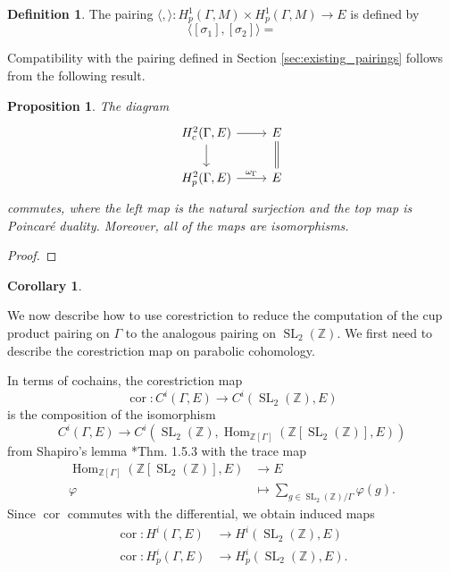 \documentclass[10pt]{amsart}
\theoremstyle{plain}
\newtheorem{proposition}[theorem]{Proposition}
\newtheorem{corollary}[theorem]{Corollary}
\theoremstyle{definition}
\newtheorem{definition}[theorem]{Definition}
\newcommand{\ZZ}{{\mathbb{Z}}}
\DeclareMathOperator{\Hom}{Hom}
\DeclareMathOperator{\SL}{SL}
\DeclareMathOperator{\cor}{cor}
\begin{document}
\begin{definition}
The pairing $\langle , \rangle : H^1_p(\Gamma, M) \times H^1_p(\Gamma, M) \to E$ is defined by
\[
\langle [\sigma_1], [\sigma_2] \rangle =
\]
\end{definition}
Compatibility with the pairing defined in Section \ref{sec:existing_pairings} follows from the following result.

\begin{proposition}
The diagram
\[
\begin{tikzcd}
H^2_c(\Gamma, E) \arrow{r} \arrow{d} & E \arrow[equal]{d} \\
H^2_p(\Gamma, E) \arrow{r}{\omega_\Gamma} & E
\end{tikzcd}
\]
commutes, where the left map is the natural surjection and the top map is Poincar\'e duality.  Moreover, all of the maps are isomorphisms.
\end{proposition}
\begin{proof}

\end{proof}

\begin{corollary}

\end{corollary}

We now describe how to use corestriction to reduce the computation of the cup product pairing
on $\Gamma$ to the analogous pairing on $\SL_2(\ZZ)$.  We first need to describe the corestriction
map on parabolic cohomology.

In terms of cochains, the corestriction map
\[
\cor : C^i(\Gamma, E) \to C^i(\SL_2(\ZZ), E)
\]
is the composition of the isomorphism
\[
C^i(\Gamma, E) \to C^i(\SL_2(\ZZ), \Hom_{\ZZ[\Gamma]}(\ZZ[\SL_2(\ZZ)], E))
\]
from Shapiro's lemma \cite{Sharifi}*{Thm. 1.5.3} with the trace map
\begin{align*}
\Hom_{\ZZ[\Gamma]}(\ZZ[\SL_2(\ZZ)], E) &\to E \\
\varphi &\mapsto \sum_{g \in \SL_2(\ZZ)/\Gamma} \varphi(g).
\end{align*}
Since $\cor$ commutes with the differential, we obtain induced maps
\begin{align*}
\cor : H^i(\Gamma, E) &\to H^i(\SL_2(\ZZ), E) \\
\cor : H^i_p(\Gamma, E) &\to H^i_p(\SL_2(\ZZ), E).
\end{align*}
\end{document}
